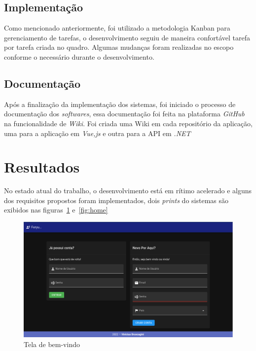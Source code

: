 \documentclass[12pt]{article}
\begin{document}
\subsection{Implementação}

Como mencionado anteriormente, foi utilizado a metodologia Kanban para gerenciamento
de tarefas, o desenvolvimento seguiu de maneira confortável tarefa por tarefa
criada no quadro. Algumas mudanças foram realizadas no escopo conforme o necessário durante o desenvolvimento.

\subsection{Documentação}

Após a finalização da implementação dos sistemas, foi iniciado o processo de documentação
dos \textit{softwares}, essa documentação foi feita na plataforma \textit{GitHub} na funcionalidade
de \textit{Wiki}. Foi criada uma Wiki em cada repositório da aplicação, uma para a aplicação em \textit{Vue,js}
e outra para a API em \textit{.NET}

\section{Resultados}

No estado atual do trabalho, o desenvolvimento está em rítimo acelerado e alguns
dos requisitos propostos foram implementados, dois \textit{prints} do sistemas
são exibidos nas figuras~\ref{fig:welcome} e~\ref{fig:home}

\begin{figure}[H]
    \centering
    \includegraphics[width=1\textwidth]{prints/welcome.png}
    \caption{Tela de bem-vindo}\label{fig:welcome}
\end{figure}
\end{document}

